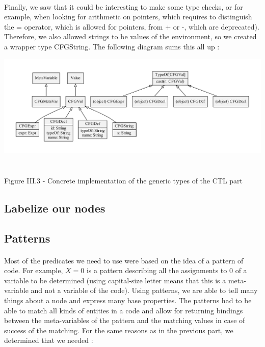 \documentclass{report}
\begin{document}
\paragraph{}
\hspace{4mm}Finally, we saw that it could be interesting to make some type checks, or for example, when looking for arithmetic on pointers, which requires to distinguish the = operator, which is allowed for pointers, from + or -, which are deprecated).
Therefore, we also allowed strings to be values of the environment, so we created a wrapper type CFGString. The following diagram sums this all up :

\begin{center}
\includegraphics[scale=0.65]{data/merge_types}
~\\~\\Figure III.3 - Concrete implementation of the generic types of the CTL part
\end{center}

\subsection{Labelize our nodes}

\subsection* {Patterns}
\paragraph{}
\hspace{4mm}Most of the predicates we need to use were based on the idea of a pattern of code. For example, $X = 0$ is a pattern describing all the assignments to 0
of a variable to be determined (using capital-size letter means that this is a meta-variable and not a variable of the code). Using patterns, we are able 
to tell many things about a node and express many base properties. The patterns had to be able to match all kinds of entities in a code and allow for 
returning bindings between the meta-variables of the pattern and the matching values in case of success of the matching. For the same reasons as in the
previous part, we determined that we needed :
\end{document}
